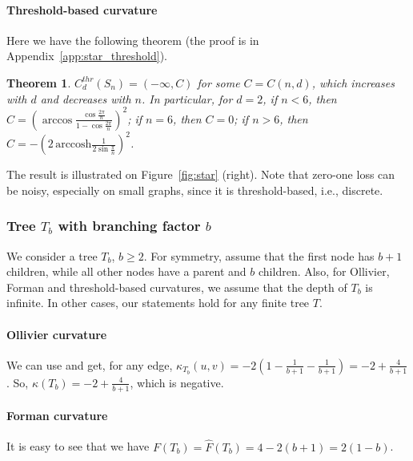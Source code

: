 \documentclass{article} %
\newtheorem{theorem}{Theorem}[section]
\begin{document}
\paragraph{Threshold-based curvature} 
Here we have the following theorem (the proof is in Appendix~\ref{app:star_threshold}).

\begin{theorem}\label{thm:star_threshold}
$C_d^{thr}(S_n) = (-\infty, C)$ for some $C = C(n,d)$, which increases with $d$ and decreases with $n$. In particular, for $d = 2$, if $n < 6$, then $C = \left(\arccos \frac{\cos \frac{2\pi}{n}}{1 - \cos \frac{2\pi}{n}}\right)^2$; if $n = 6$, then $C = 0$; if $n > 6$, then $C = - \left(2\,\mathrm{arccosh}\frac{1}{2\sin \frac{\pi}{n}}\right)^2$.
\end{theorem}

The result is illustrated on Figure~\ref{fig:star} (right). Note that zero-one loss can be noisy, especially on small graphs, since it is threshold-based, i.e., discrete.

\subsubsection{Tree $T_b$ with branching factor $b$}


We consider a tree $T_b$, $b \ge 2$. For symmetry, assume that the first node has $b+1$ children, while all other nodes have a parent and $b$ children. Also, for Ollivier, Forman and threshold-based curvatures, we assume that the depth of $T_b$ is infinite. In other cases, our statements hold for any finite tree $T$.

\paragraph{Ollivier curvature} We can use  and get, for any edge,
$\kappa_{T_b}(u,v) = -2 \left(1 - \frac{1}{b+1} - \frac{1}{b+1} \right) = - 2 + \frac{4}{b+1}$. So, $\kappa(T_b) = -2 + \frac{4}{b+1}$, which is negative.

\paragraph{Forman curvature} 
It is easy to see that we have 
$F(T_b) = \hat F(T_b) = 4 - 2(b+1) = 2(1-b)$.
\end{document}
